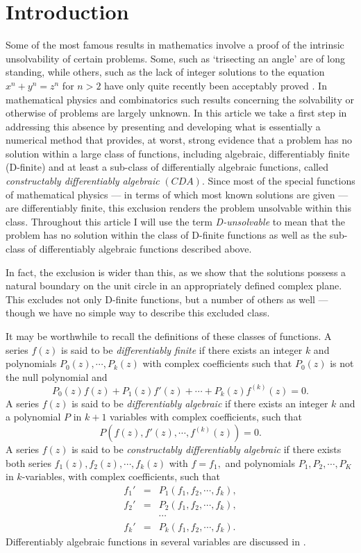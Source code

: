 \section{Introduction}
\label{Intro}
Some of the most famous results in mathematics involve a proof
of the intrinsic unsolvability of certain problems. Some, such
as `trisecting an angle' are of long standing, while others, such
as the lack of integer solutions to the equation $x^n + y^n = z^n$
for $n > 2$  have only quite recently been acceptably
proved \cite{Wil}. In mathematical physics and combinatorics
such results concerning the solvability or otherwise of problems
are largely unknown. In this article we take a
first step in addressing this absence by presenting and developing
what is essentially a numerical method that provides, at worst,
strong evidence that a problem has no solution within a large
class of functions, including algebraic,  differentiably finite
(D-finite) \cite{Stan80,Lip89} and at least a sub-class \cite{Berg90} of 
differentially algebraic functions, called {\em constructably
differentiably algebraic}  $(CDA).$  Since most
of the special functions of mathematical physics --- in terms of
which most known solutions are given --- are differentiably finite,
this exclusion renders the problem unsolvable within this class.
Throughout this article I will use the term {\em D-unsolvable}
to mean that the problem has no solution within the class of
D-finite functions as well as the sub-class of
differentiably algebraic functions described above.


In fact, the exclusion is wider than this, as we show that the
solutions  possess a natural boundary on the unit circle in an
appropriately defined complex plane. This excludes not only
D-finite functions, but a number of others as well --- though we
have no simple way to describe this excluded class.

It may be worthwhile to recall the definitions of these classes of
functions.
A series $f(z)$ is said to be {\em differentiably finite}
if there exists an integer $k$ and polynomials $P_0(z), \cdots, P_k(z)$
with complex coefficients such that $P_0(z)$ is not the null polynomial and
$$P_0(z)f(z) + P_1(z)f'(z) + \cdots + P_k(z)f^{(k)}(z) = 0. $$ 
A series $f(z)$ is said to be {\em differentiably algebraic}
if there exists an integer $k$ and a polynomial $P$ in $k+1$ variables
with complex coefficients, such that
$$P(f(z),f'(z), \cdots, f^{(k)}(z)) = 0.$$
A series $f(z)$ is said to be {\em constructably differentiably algebraic}
if there exists both series $f_1(z), f_2(z), \cdots , f_k(z)$ with $f = f_1,$
and  polynomials $P_1, P_2, \cdots, P_K$ in $k$-variables, with
complex coefficients, such that
\begin{eqnarray}
f_1' &=& P_1(f_1,f_2,\cdots,f_k),\\
f_2' &=& P_2(f_1,f_2,\cdots,f_k), \nonumber \\
     &  & \cdots \nonumber \\
f_k' &=& P_k(f_1,f_2,\cdots,f_k).\nonumber
\end{eqnarray}
Differentiably algebraic functions in several variables are discussed
in \cite{Lip89}.



